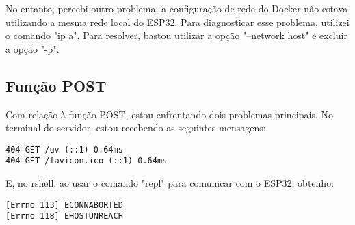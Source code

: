 No entanto, percebi outro problema: a configuração de rede do Docker não estava utilizando a mesma rede local do ESP32. Para diagnosticar esse problema, utilizei o comando "ip a". Para resolver, bastou utilizar a opção "--network host" e excluir a opção "-p".

\subsection{Função POST}

Com relação à função POST, estou enfrentando dois problemas principais. No terminal do servidor, estou recebendo as seguintes mensagens:

\begin{lstlisting}[breaklines]
404 GET /uv (::1) 0.64ms
404 GET /favicon.ico (::1) 0.64ms
\end{lstlisting}

E, no rshell, ao usar o comando "repl" para comunicar com o ESP32, obtenho:

\begin{lstlisting}[breaklines]
[Errno 113] ECONNABORTED
[Errno 118] EHOSTUNREACH
\end{lstlisting}
